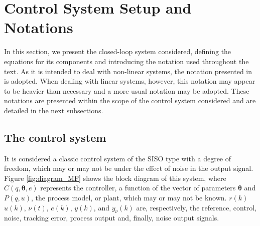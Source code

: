 \section{Control System Setup and Notations}%
\label{sec:system_setup_}

In this section, we present the closed-loop system considered, defining the equations for its components and introducing the notation used throughout the text. As it is intended to deal with non-linear systems, the notation presented in \cite{campi2006} is adopted. When dealing with linear systems, however, this notation may appear to be heavier than necessary and a more usual notation may be adopted. These notations are presented within the scope of the control system considered and are detailed in the next subsections.

\subsection{The control system}
\label{sub:o_sistema_de_controle}

It is considered a classic control system of the SISO type with a degree of freedom, which may or may not be under the effect of noise in the output signal. Figure \ref{fig:diagram_MF} shows the block diagram of this system, where $C(q, \bm{\theta}, e)$ represents the controller, a function of the vector of parameters $\bm{\theta}$ and $P(q,u)$, the process model, or plant, which may or may not be known. $r(k)$ 
 $u(k)$, $\nu(t)$, $e(k)$, $y(k)$, and $y_\nu(k)$ are, respectively, the reference, control, noise, tracking error, process output and, finally, noise output signals.

